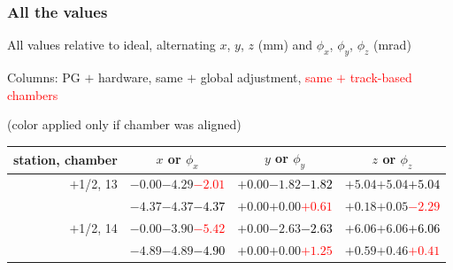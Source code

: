 \documentclass[compress]{beamer}
\begin{document}
\begin{frame}
\frametitle{All the values}
\tiny

All values relative to ideal, alternating $x$, $y$, $z$ (mm) and $\phi_x$, $\phi_y$, $\phi_z$ (mrad)

Columns: PG $+$ hardware, same $+$ global adjustment, \textcolor{red}{same $+$ track-based chambers}

\hfill (color applied only if chamber was aligned)

\vfill
\renewcommand{\arraystretch}{1.1}
\begin{tabular}{r | c | c | c}
station, chamber & $x$ or $\phi_x$ & $y$ or $\phi_y$ & $z$ or $\phi_z$ \\\hline
$+$1/2, 13 & $-0.00$\hspace{0.1 cm}$-4.29$\hspace{0.1 cm}\textcolor{red}{$-2.01$} & $+0.00$\hspace{0.1 cm}$-1.82$\hspace{0.1 cm}\textcolor{black}{$-1.82$} & $+5.04$\hspace{0.1 cm}$+5.04$\hspace{0.1 cm}\textcolor{black}{$+5.04$} \\
           & $-4.37$\hspace{0.1 cm}$-4.37$\hspace{0.1 cm}\textcolor{black}{$-4.37$} & $+0.00$\hspace{0.1 cm}$+0.00$\hspace{0.1 cm}\textcolor{red}{$+0.61$} & $+0.18$\hspace{0.1 cm}$+0.05$\hspace{0.1 cm}\textcolor{red}{$-2.29$} \\
$+$1/2, 14 & $-0.00$\hspace{0.1 cm}$-3.90$\hspace{0.1 cm}\textcolor{red}{$-5.42$} & $+0.00$\hspace{0.1 cm}$-2.63$\hspace{0.1 cm}\textcolor{black}{$-2.63$} & $+6.06$\hspace{0.1 cm}$+6.06$\hspace{0.1 cm}\textcolor{black}{$+6.06$} \\
           & $-4.89$\hspace{0.1 cm}$-4.89$\hspace{0.1 cm}\textcolor{black}{$-4.90$} & $+0.00$\hspace{0.1 cm}$+0.00$\hspace{0.1 cm}\textcolor{red}{$+1.25$} & $+0.59$\hspace{0.1 cm}$+0.46$\hspace{0.1 cm}\textcolor{red}{$+0.41$} \\

\end{tabular}
\end{frame}
\end{document}
